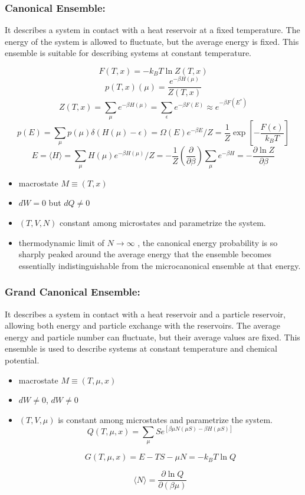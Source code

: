 \documentclass{article}
\begin{document}
\subsubsection{Canonical Ensemble:} It describes a system in contact with a heat reservoir at a fixed temperature. The energy of the system is allowed to fluctuate, but the average energy is fixed. This ensemble is suitable for describing systems at constant temperature.

$$F(T, x) = -k_BT \ln Z(T, x)$$
$$p(T, x)(\mu) = \frac{e^{-\beta H(\mu)}}{Z(T, x)}$$
$$Z(T, x) = \sum_{\mu} e^{-\beta H(\mu)} = \sum_{\epsilon} e^{-\beta F(E)} \approx e^{-\beta F(E^*)}$$
$$p(E) = \sum_{\mu} p(\mu) \delta(H(\mu) - \epsilon) = \Omega(E) e^{-\beta E}/Z = \frac{1}{Z}\exp\left[-\frac{F(\epsilon)}{k_BT}\right]
$$
$$E = \langle H \rangle = \sum_{\mu} H(\mu)e^{-\beta H(\mu)}/Z = -\frac{1}{Z}\left(\frac{\partial}{\partial\beta}\right)\sum_{\mu} e^{-\beta H} =-\frac{\partial \ln Z}{\partial \beta}$$
\begin{itemize}
    \item macrostate $M \equiv (T, x)
$
\item $dW = 0$ but
$dQ \neq 0$
\item $(T,V,N)$ constant among microstates and parametrize the system.
\item thermodynamic limit of $N \rightarrow \infty$
, the canonical energy probability is so sharply peaked around the average energy that
the ensemble becomes essentially indistinguishable from the microcanonical ensemble at that energy.


\end{itemize}




\subsubsection{Grand Canonical Ensemble:} It describes a system in contact with a heat reservoir and a particle reservoir, allowing both energy and particle exchange with the reservoirs. The average energy and particle number can fluctuate, but their average values are fixed. This ensemble is used to describe systems at constant temperature and chemical potential.
\begin{itemize}
    \item macrostate $M \equiv (T, \mu, x)
$
\item $dW \neq 0$, $dW \neq 0$


\item $(T, V, \mu)$ is constant among microstates and parametrize the system.
$$Q(T, \mu, x) = \sum_{\mu}S e^{\left[\beta\mu N(\mu S)-\beta H(\mu S)\right]}$$

$$G(T, \mu, x) = E - TS - \mu N = -k_BT \ln Q$$

$$\langle N \rangle = \frac{\partial \ln Q}{\partial (\beta\mu)}$$



\end{itemize}
\end{document}
